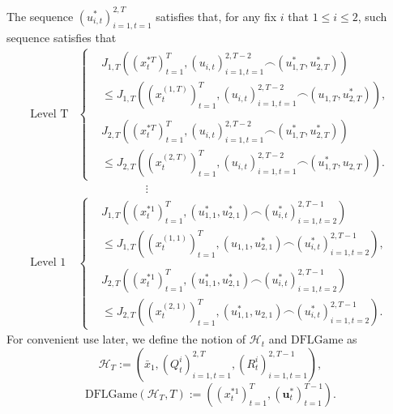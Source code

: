 \documentclass{article}
\begin{document}
The sequence $( u_{i,t}^{*})_{i=1,t=1}^{2,T}$ satisfies that, for any fix $i$ that $1 \leq i \leq 2$, such 
sequence satisfies that 
\begin{equation}\label{eq:nashIneq}
    \begin{split}
        \text{Level T}
        &\begin{cases}
            &J_{1,T}((x_{t}^{*T})_{t=1}^{T}, (u_{i,t})_{i=1,t=1}^{2,T-2} \frown (u_{1,T}^{*},u_{2,T}^{*})) \\ & \leq J_{1,T}((x_{t}^{(1,T)})_{t=1}^{T}, (u_{i,t})_{i=1,t=1}^{2,T-2} \frown (u_{1,T},u_{2,T}^{*})),\\ \\
            &J_{2,T}((x_{t}^{*T})_{t=1}^{T}, (u_{i,t})_{i=1,t=1}^{2,T-2} \frown (u_{1,T}^{*},u_{2,T}^{*})) \\ & \leq J_{2,T}((x_{t}^{(2,T)})_{t=1}^{T}, (u_{i,t})_{i=1,t=1}^{2,T-2} \frown (u_{1,T}^{*},u_{2,T})).
        \end{cases}
    \\ &\qquad \qquad \qquad \vdots \\
    \text{Level 1}
        &\begin{cases}
            &J_{1,T}((x_{t}^{*1})_{t=1}^{T}, (u_{1,1}^{*},u_{2,1}^{*}) \frown (u_{i,t}^{*})_{i=1,t=2}^{2,T-1}) \\ & \leq J_{1,T}((x_{t}^{(1,1)})_{t=1}^{T}, (u_{1,1},u_{2,1}^{*}) \frown (u_{i,t}^{*})_{i=1,t=2}^{2,T-1}),\\ \\
            &J_{2,T}((x_{t}^{*1})_{t=1}^{T}, (u_{1,1}^{*},u_{2,1}^{*}) \frown (u_{i,t}^{*})_{i=1,t=2}^{2,T-1}) \\ & \leq J_{2,T}((x_{t}^{(2,1)})_{t=1}^{T}, (u_{1,1}^{*},u_{2,1}) \frown (u_{i,t}^{*})_{i=1,t=2}^{2,T-1}).
        \end{cases}
    \end{split}
\end{equation}
For convenient use later, we define the notion of $\mathcal{H}_{t}$ and $\text{DFLGame}$ as
\begin{equation}\label{eq:history}
    \mathcal{H}_{T} := ( \bar{x}_{1},(Q_{t}^{i})_{i=1,t=1}^{2,T},(R_{t}^{i})_{i=1,t=1}^{2,T-1}),
\end{equation}
\begin{equation}\label{eq:regret}
 \text{DFLGame}(\mathcal{H}_{T},T):=((x_{t}^{*1})_{t=1}^{T}, (\mathbf{u}_{t}^{*})_{t=1}^{T-1}).
\end{equation}
\end{document}
